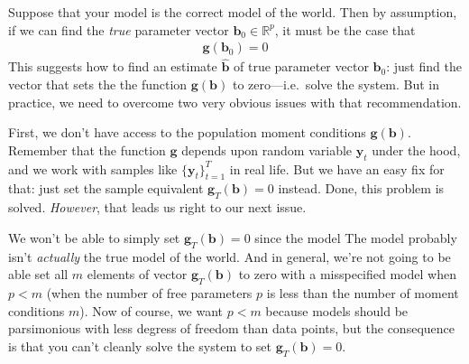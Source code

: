 \documentclass[12pt]{article}
\theoremstyle{plain}
\theoremstyle{definition}
\theoremstyle{remark}
\newcommand{\bsb}{\boldsymbol{b}}
\newcommand{\bshatb}{\boldsymbol{\hat{b}}}
\newcommand{\bsg}{\boldsymbol{g}}
\newcommand{\bsy}{\boldsymbol{y}}
\begin{document}
Suppose that your model is the correct model of the world. Then by
assumption, if we can find the \emph{true} parameter vector
$\bsb_0\in \mathbb{R}^p$, it must be the case that
\begin{align}
  \bsg(\bsb_0) = 0
  \label{eq:gmmtrue}
\end{align}
This suggests how to find an estimate $\bshatb$ of true
parameter vector $\bsb_0$: just find the vector that sets the
the function $\bsg(\bsb)$ to zero---i.e.\ solve the
system.  But in practice, we need to overcome two very obvious issues
with that recommendation.

First, we don't have access to the population moment conditions
$\bsg(\bsb)$. Remember that the function
$\bsg$ depends upon random variable $\bsy_t$ under
the hood, and we work with samples like $\{\bsy_t\}_{t=1}^T$
in real life.  But we have an easy fix for that: just set the sample
equivalent $\bsg_T(\bsb)=0$ instead. Done, this
problem is solved.  \emph{However}, that leads us right to our next
issue.

We won't be able to simply set $\bsg_T(\bsb)=0$
since the model The model probably isn't \emph{actually} the true model
of the world. And in general, we're not going to be able set all $m$
elements of vector $\bsg_T(\bsb)$ to zero with a
misspecified model when $p<m$ (when the number of free parameters $p$ is
less than the number of moment conditions $m$).  Now of course, we want
$p<m$ because models should be parsimonious with less degress of freedom
than data points, but the consequence is that you can't cleanly solve
the system to set $\bsg_T(\bsb)=0$.
\end{document}
